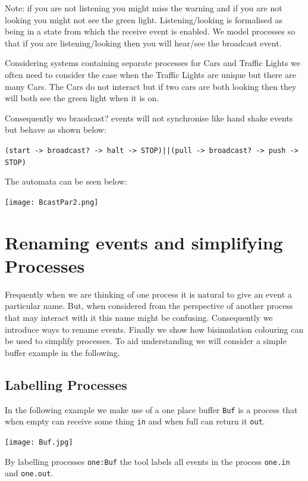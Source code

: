 \documentclass[]{article}
\begin{document}
	
	
Note: if you are not listening you might miss the warning and if you are not looking you might not see the green light. Listening/looking is formalised as being in a state from which the receive event is enabled. We model processes so that if you are listening/looking then you will hear/see the broadcast event.



Considering systems containing separate processes for  {\sf Cars} and {\sf Traffic Lights} we often need to consider the case when the {\sf Traffic Lights} are unique but there are many {\sf Cars}.  The {\sf Cars} do not interact but if two cars are both looking then they will both see the green light when it is on.

Consequently wo  {\sf braodcast?} events will not synchronise  like  hand shake events but behave as shown below:


\begin{center}\verb$(start -> broadcast? -> halt -> STOP)||(pull -> broadcast? -> push -> STOP)$
\end{center}
The automata  can be seen  below:
\begin{center}	
	\texttt{[image: BcastPar2.png]} \end{center}
	

\section{ Renaming events and simplifying Processes}
Frequently when we are thinking of one process it is natural to give an event a particular name. But, when considered from the perspective of another process that may interact with it this name might be confusing. Consequently we introduce ways to rename events.
Finally we show how bisimulation colouring can be used to simplify processes. To aid understanding we will consider a simple buffer example in the following.
\subsection{Labelling Processes}
In the following example we make use of a one place buffer \verb$Buf$ is a process that when empty can receive some thing \verb$in$ and when full can return it \verb$out$.
\noindent\begin{center} \texttt{[image: Buf.jpg]} \end{center}
By labelling  processes  \verb$one:Buf$ the tool  labels all events in the process \verb$one.in$ and \verb$one.out$.
\end{document}
